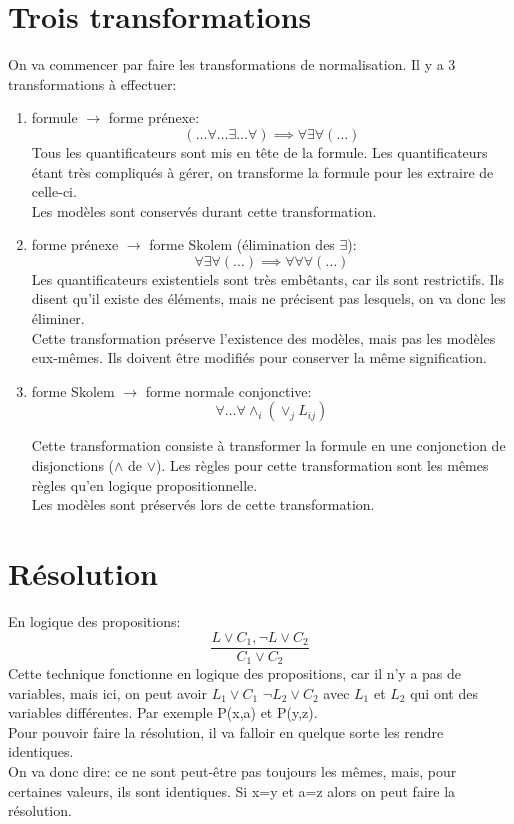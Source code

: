 {\section{Trois transformations} 
On va commencer par faire les transformations de normalisation. Il y a 3 transformations à effectuer: 
\begin{enumerate}
    \item formule $\to$ forme prénexe: $$(\ldots{}\forall{}\ldots{}\exists{}\ldots{}\forall{} )\implies \forall{}\exists{}\forall{}(\ldots{})$$
    Tous les quantificateurs sont mis en tête de la formule. Les quantificateurs étant très compliqués à gérer, on transforme la formule pour les extraire de celle-ci. \\Les modèles sont conservés durant cette transformation.
    \item forme prénexe $\to$ forme Skolem (élimination des $\exists{}$): $$ \forall{}\exists{}\forall{}(\ldots{})  \implies \forall{}\forall{}\forall{}(\ldots{}) $$
    Les quantificateurs existentiels sont très embêtants, car ils sont restrictifs. Ils disent qu'il existe des éléments, mais ne précisent pas lesquels, on va donc les éliminer. \\
    Cette transformation préserve l'existence des modèles, mais pas les modèles eux-mêmes. Ils doivent être modifiés pour conserver la même signification. 
    \item forme Skolem $\to$ forme normale conjonctive: 
    \[\forall \ldots \forall \land_i(\lor_j L_{ij})\]

Cette transformation consiste à transformer la formule en une conjonction de disjonctions ($\land$ de $\lor$). Les règles pour cette transformation sont les mêmes règles qu'en logique propositionnelle. \\
Les modèles sont préservés lors de cette transformation. 
\end{enumerate}

\section{Résolution}
En logique des propositions: $$\frac{L\lor C_1, \neg L \lor C_2}{C_1\lor C_2}$$
Cette technique fonctionne en logique des propositions, car il n'y a pas de variables, mais ici, on peut avoir $L_1 \lor C_1$ \hspace{10pt} $\neg L_2 \lor C_2$  avec $L_1$ et $L_2$ qui ont des variables différentes. Par exemple P(x,a) et P(y,z).\\
Pour pouvoir faire la résolution, il va falloir en quelque sorte les rendre identiques. \\
On va donc dire: ce ne sont peut-être pas toujours les mêmes, mais, pour certaines valeurs, ils sont identiques. Si x=y et a=z alors on peut faire la résolution. 
}
